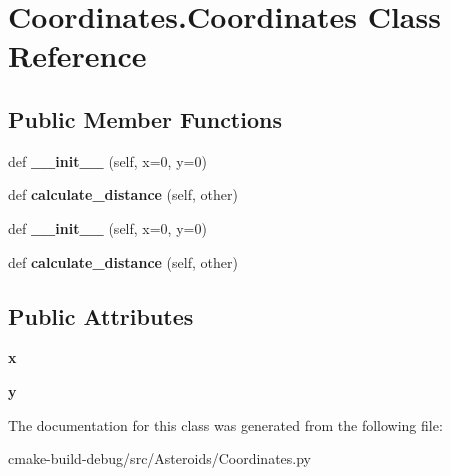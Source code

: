 \hypertarget{classCoordinates_1_1Coordinates}{}\section{Coordinates.\+Coordinates Class Reference}
\label{classCoordinates_1_1Coordinates}
\subsection*{Public Member Functions}
\begin{DoxyCompactItemize}
\item 
def {\bfseries \+\_\+\+\_\+init\+\_\+\+\_\+} (self, x=0, y=0)\hypertarget{classCoordinates_1_1Coordinates_a5ac43924c43e9785be8589b8a8332da2}{}\label{classCoordinates_1_1Coordinates_a5ac43924c43e9785be8589b8a8332da2}

\item 
def {\bfseries calculate\+\_\+distance} (self, other)\hypertarget{classCoordinates_1_1Coordinates_a9a095550405cda8a1ddeaf52c92132c8}{}\label{classCoordinates_1_1Coordinates_a9a095550405cda8a1ddeaf52c92132c8}

\item 
def {\bfseries \+\_\+\+\_\+init\+\_\+\+\_\+} (self, x=0, y=0)\hypertarget{classCoordinates_1_1Coordinates_a5ac43924c43e9785be8589b8a8332da2}{}\label{classCoordinates_1_1Coordinates_a5ac43924c43e9785be8589b8a8332da2}

\item 
def {\bfseries calculate\+\_\+distance} (self, other)\hypertarget{classCoordinates_1_1Coordinates_a9a095550405cda8a1ddeaf52c92132c8}{}\label{classCoordinates_1_1Coordinates_a9a095550405cda8a1ddeaf52c92132c8}

\end{DoxyCompactItemize}
\subsection*{Public Attributes}
\begin{DoxyCompactItemize}
\item 
{\bfseries x}\hypertarget{classCoordinates_1_1Coordinates_a3aba78cfc8f0666027e7573edc372b7c}{}\label{classCoordinates_1_1Coordinates_a3aba78cfc8f0666027e7573edc372b7c}

\item 
{\bfseries y}\hypertarget{classCoordinates_1_1Coordinates_a4f539bd171f295556d6cbd8224d66019}{}\label{classCoordinates_1_1Coordinates_a4f539bd171f295556d6cbd8224d66019}

\end{DoxyCompactItemize}


The documentation for this class was generated from the following file\+:\begin{DoxyCompactItemize}
\item 
cmake-\/build-\/debug/src/\+Asteroids/Coordinates.\+py\end{DoxyCompactItemize}
